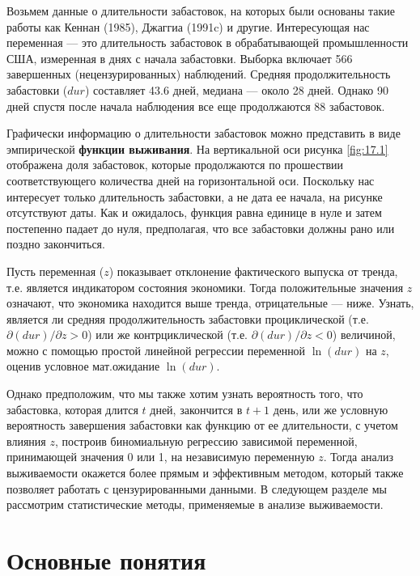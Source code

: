 \noindent
Возьмем данные о длительности забастовок, на которых были основаны %
такие работы как Кеннан (1985), Джаггиа (1991c) и другие. Интересующая нас переменная --- это длительность забастовок в обрабатывающей промышленности США, измеренная в днях с начала забастовки. Выборка включает 566 завершенных (нецензурированных) наблюдений. Средняя продолжительность забастовки ($dur$) составляет 43.6 дней, медиана --- около 28 дней. Однако 90 дней спустя после начала наблюдения все еще продолжаются 88 забастовок.

Графически информацию о длительности забастовок можно представить в виде эмпирической \textbf{функции выживания}. На вертикальной оси рисунка \ref{fig:17.1} отображена доля забастовок, которые продолжаются по прошествии соответствующего количества дней на горизонтальной оси. Поскольку нас интересует только длительность забастовки, а не дата ее начала, на рисунке отсутствуют даты. Как и ожидалось, функция равна единице в нуле и затем постепенно падает до нуля, предполагая, что все забастовки должны рано или поздно закончиться.

Пусть переменная ($z$) показывает отклонение фактического выпуска от тренда, т.е. является индикатором состояния экономики. Тогда положительные значения $z$ означают, что экономика находится выше тренда, отрицательные --- ниже. Узнать, является ли средняя продолжительность забастовки проциклической (т.е. $\partial (dur) / \partial z > 0$) или же контрциклической (т.е. $\partial (dur) / \partial z < 0$) величиной, можно с помощью простой линейной регрессии переменной $\ln (dur)$ на $z$, оценив условное мат.ожидание $\ln (dur)$.

Однако предположим, что мы также хотим узнать вероятность того, что забастовка, которая длится $t$ дней, закончится в $t+1$ день, или же условную вероятность завершения забастовки как функцию от ее длительности, с учетом влияния $z$, построив биномиальную регрессию зависимой переменной, принимающей значения 0 или 1, на независимую переменную $z$. Тогда анализ выживаемости окажется более прямым и эффективным методом, который также позволяет работать с цензурированными данными. В следующем разделе мы рассмотрим статистические методы, применяемые в анализе выживаемости.




\section{Основные понятия}\label{sec:17.3}

